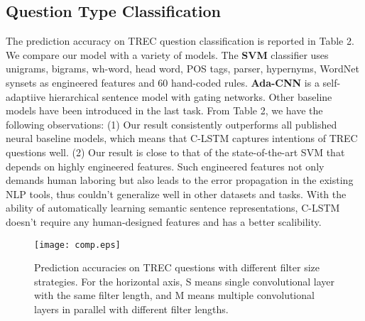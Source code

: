 \documentclass[11pt,letterpaper]{article}
\begin{document}
\subsection{Question Type Classification}
The prediction accuracy on TREC question classification is reported in
Table 2. We compare our model with a variety of models. The {\bf SVM}
classifier uses unigrams, bigrams, wh-word, head word, POS tags,
parser, hypernyms, WordNet synsets as engineered features and 60
hand-coded rules. {\bf Ada-CNN} is a self-adaptiive hierarchical sentence
model with gating networks. Other baseline models have been introduced
in the last task. From Table 2, we have the following observations:
(1) Our result consistently outperforms all published neural baseline models, which means that C-LSTM
captures intentions of TREC questions well.
(2) Our result is close to that of the state-of-the-art SVM that depends on highly engineered features. Such engineered features not only demands human laboring but also leads to the error propagation in the existing NLP tools, thus couldn't generalize well in other datasets and tasks. With the ability of automatically learning semantic sentence representations, C-LSTM doesn't require any human-designed features and has a better scalibility.

\begin{figure}[th]
\centering
\texttt{[image: comp.eps]}
\caption{Prediction accuracies on TREC questions with different filter
size strategies. For the horizontal axis, S means single convolutional
layer with the same filter length, and M means multiple convolutional
layers in parallel with different filter lengths.}
\end{figure}
\end{document}
